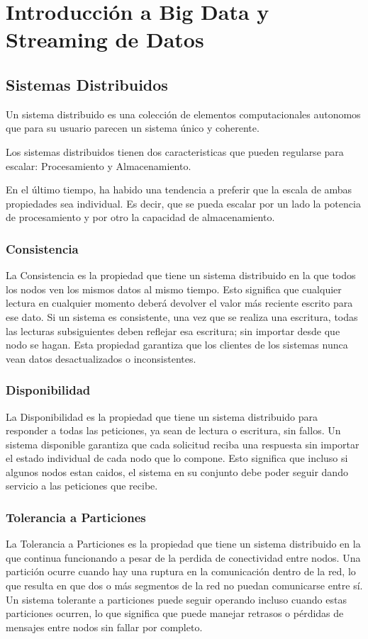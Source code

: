 \section{Introducción a Big Data y Streaming de Datos}

\subsection{Sistemas Distribuidos}
Un sistema distribuido es una colección de elementos computacionales autonomos que para su usuario 
parecen un sistema único y coherente. \parencite{tanenbaum}

Los sistemas distribuidos tienen dos caracteristicas que pueden regularse para escalar: Procesamiento y Almacenamiento.

En el último tiempo, ha habido una tendencia a preferir que la escala de ambas propiedades sea individual. 
Es decir, que se pueda escalar por un lado la potencia de procesamiento y por otro la capacidad de almacenamiento.

\subsubsection{Consistencia}
La Consistencia es la propiedad que tiene un sistema distribuido en la que todos los nodos ven los mismos datos al mismo tiempo.
Esto significa que cualquier lectura en cualquier momento deberá devolver el valor más reciente escrito para ese dato.
Si un sistema es consistente, una vez que se realiza una escritura, todas las lecturas subsiguientes deben reflejar esa escritura;
sin importar desde que nodo se hagan. 
Esta propiedad garantiza que los clientes de los sistemas nunca vean datos desactualizados o inconsistentes.
\newpage
\subsubsection{Disponibilidad}
La Disponibilidad es la propiedad que tiene un sistema distribuido para responder a todas las peticiones, ya sean de lectura o escritura, sin fallos.
Un sistema disponible garantiza que cada solicitud reciba una respuesta sin importar el estado individual de cada nodo que lo compone.
Esto significa que incluso si algunos nodos estan caidos, el sistema en su conjunto debe poder seguir dando servicio a las peticiones que recibe.
\subsubsection{Tolerancia a Particiones}
La Tolerancia a Particiones es la propiedad que tiene un sistema distribuido en la que continua funcionando a pesar de la perdida de 
conectividad entre nodos. Una partición ocurre cuando hay una ruptura en la comunicación dentro de la red, 
lo que resulta en que dos o más segmentos de la red no puedan comunicarse entre sí.
Un sistema tolerante a particiones puede seguir operando incluso cuando estas particiones ocurren, 
lo que significa que puede manejar retrasos o pérdidas de mensajes entre nodos sin fallar por completo. 

